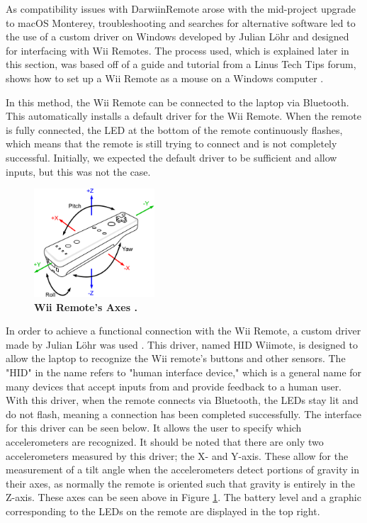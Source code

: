 \documentclass[conf]{new-aiaa}
\begin{document}
        As compatibility issues with DarwiinRemote arose with the mid-project upgrade to macOS Monterey, troubleshooting and searches for alternative software led to the use of a custom driver on Windows developed by Julian L\"{o}hr and designed for interfacing with Wii Remotes. The process used, which is explained later in this section, was based off of a guide and tutorial from a Linus Tech Tips forum, shows how to set up a Wii Remote as a mouse on a Windows computer \cite{LinusTechTips}.
        
        In this method, the Wii Remote can be connected to the laptop via Bluetooth. This automatically installs a default driver for the Wii Remote. When the remote is fully connected, the LED at the bottom of the remote continuously flashes, which means that the remote is still trying to connect and is not completely successful. Initially, we expected the default driver to be sufficient and allow inputs, but this was not the case.
        
         \begin{figure}[H]
            \centering
            \includegraphics[width=0.4\textwidth]{docs/reports/Final Project Update/images/Wiimote_axes.png}
            \caption{\textbf{Wii Remote's Axes \cite{Axes}.}}
            \label{fig:Wii_axis}
        \end{figure}
        
        In order to achieve a functional connection with the Wii Remote, a custom driver made by Julian L\"{o}hr was used \cite{JulianLohr}. This driver, named HID Wiimote, is designed to allow the laptop to recognize the Wii remote's buttons and other sensors. The "HID" in the name refers to "human interface device," which is a general name for many devices that accept inputs from and provide feedback to a human user. With this driver, when the remote connects via Bluetooth, the LEDs stay lit and do not flash, meaning a connection has been completed successfully. The interface for this driver can be seen below. It allows the user to specify which accelerometers are recognized. It should be noted that there are only two accelerometers measured by this driver; the X- and Y-axis. These allow for the measurement of a tilt angle when the accelerometers detect portions of gravity in their axes, as normally the remote is oriented such that gravity is entirely in the Z-axis. These axes can be seen above in Figure \ref{fig:Wii_axis}. The battery level and a graphic corresponding to the LEDs on the remote are displayed in the top right.
        
\end{document}
